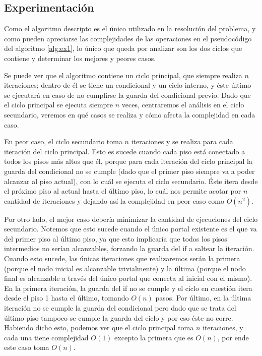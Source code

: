 \documentclass{article}
\theoremstyle{definition}
\theoremstyle{remark}
\begin{document}
\subsection{Experimentación}

Como el algoritmo descripto es el único utilizado en la resolución del problema, y como pueden apreciarse las complejidades de las operaciones en el pseudocódigo del algoritmo \ref{alg:ex1}, lo único que queda por analizar son los dos ciclos que contiene y determinar los mejores y peores casos.

Se puede ver que el algoritmo contiene un ciclo principal, que siempre realiza $n$ iteraciones; dentro de él se tiene un condicional y un ciclo interno, y éste último se ejecutará en caso de no cumplirse la guarda del condicional previo. Dado que el ciclo principal se ejecuta siempre $n$ veces, centraremos el análisis en el ciclo secundario, veremos en qué casos se realiza y cómo afecta la complejidad en cada caso.

En peor caso, el ciclo secundario toma $n$ iteraciones y se realiza para cada iteración del ciclo principal. Esto es sucede cuando cada piso está conectado a todos los pisos más altos que él, porque para cada iteración del ciclo principal la guarda del condicional no se cumple (dado que el primer piso siempre va a poder alcanzar al piso actual), con lo cuál se ejecuta el ciclo secundario. Éste itera desde el próximo piso al actual hasta el último piso, lo cuál nos permite acotar por $n$ cantidad de iteraciones y dejando así la complejidad en peor caso como $O(n^2)$.


Por otro lado, el mejor caso debería minimizar la cantidad de ejecuciones del ciclo secundario. Notemos que esto sucede cuando el único portal existente es el que va del primer piso al último piso, ya que esto implicaría que todos los pisos intermedios no serían alcanzables, forzando la guarda del if a saltear la iteración. Cuando esto sucede, las únicas iteraciones que realizaremos serán la primera (porque el nodo inicial es alcanzable trivialmente) y la última (porque el nodo final es alcanzable a través del único portal que conecta al inicial con el mismo). En la primera iteración, la guarda del if no se cumple y el ciclo en cuestión itera desde el piso 1 hasta el último, tomando $O(n)$ pasos. Por último, en la última iteración no se cumple la guarda del condicional pero dado que se trata del último piso tampoco se cumple la guarda del ciclo y por eso éste no corre. Habiendo dicho esto, podemos ver que el ciclo principal toma $n$ iteraciones, y cada una tiene complejidad $O(1)$ excepto la primera que es $O(n)$, por ende este caso toma $O(n)$.
\end{document}
